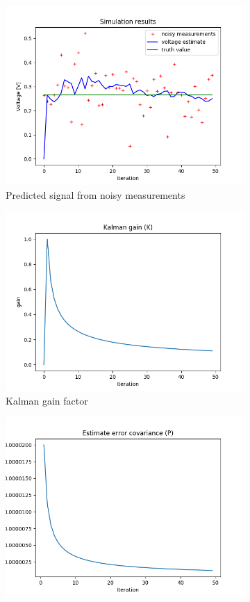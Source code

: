 \documentclass{article}
\begin{document}
    \begin{figure}
        \begin{subfigure} {.5\textwidth}  
            \centering 
            \includegraphics[width=0.8\linewidth]{./img/r00001q_.png}
            \caption{Predicted signal from noisy measurements }
        \end{subfigure}
        \begin{subfigure}{.5\textwidth}            
            \centering
            \includegraphics[width=0.8\linewidth]{./img/r00001q_K.png}
            \caption{Kalman gain factor}
        \end{subfigure}
        \begin{subfigure} {.5\textwidth}  
            \centering 
            \includegraphics[width=0.8\linewidth]{./img/r00001q_P.png}

\end{subfigure}
\end{figure}
\end{document}
